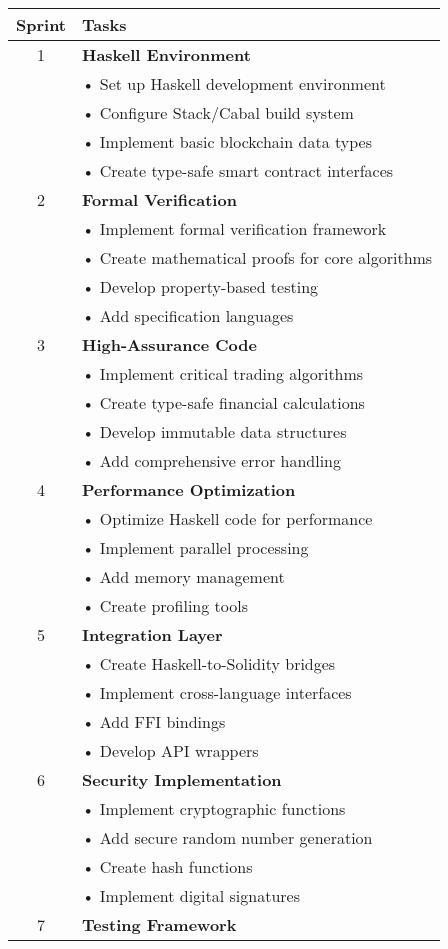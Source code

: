 \documentclass{article}
\begin{document}
\begin{longtable}{|c|p{}|}
\hline
\textbf{Sprint} & \textbf{Tasks} \\
\hline
1 & \textbf{Haskell Environment}\\
& • Set up Haskell development environment\\
& • Configure Stack/Cabal build system\\
& • Implement basic blockchain data types\\
& • Create type-safe smart contract interfaces\\
\hline
2 & \textbf{Formal Verification}\\
& • Implement formal verification framework\\
& • Create mathematical proofs for core algorithms\\
& • Develop property-based testing\\
& • Add specification languages\\
\hline
3 & \textbf{High-Assurance Code}\\
& • Implement critical trading algorithms\\
& • Create type-safe financial calculations\\
& • Develop immutable data structures\\
& • Add comprehensive error handling\\
\hline
4 & \textbf{Performance Optimization}\\
& • Optimize Haskell code for performance\\
& • Implement parallel processing\\
& • Add memory management\\
& • Create profiling tools\\
\hline
5 & \textbf{Integration Layer}\\
& • Create Haskell-to-Solidity bridges\\
& • Implement cross-language interfaces\\
& • Add FFI bindings\\
& • Develop API wrappers\\
\hline
6 & \textbf{Security Implementation}\\
& • Implement cryptographic functions\\
& • Add secure random number generation\\
& • Create hash functions\\
& • Implement digital signatures\\
\hline
7 & \textbf{Testing Framework}\\

\end{longtable}
\end{document}
